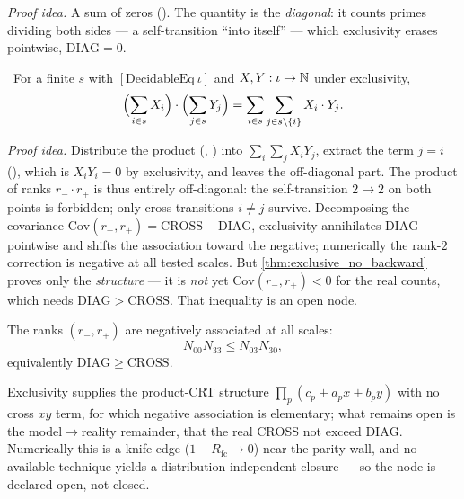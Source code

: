\emph{Proof idea.} A sum of zeros (). The quantity is the
\emph{diagonal}: it counts primes dividing both sides --- a self-transition ``into itself'' ---
which exclusivity erases pointwise, $\mathrm{DIAG}=0$.

\begin{theorem}\label{thm:exclusive_no_backward}
\green{}\ For a finite $s$ with $[\mathrm{DecidableEq}\ \iota]$ and $X,Y:\iota\to\mathbb{N}$ under exclusivity,
\begin{equation}\label{eq:no-backward}
\Bigl(\sum_{i\in s}X_i\Bigr)\cdot\Bigl(\sum_{j\in s}Y_j\Bigr)=\sum_{i\in s}\sum_{j\in s\setminus\{i\}}X_i\cdot Y_j.
\end{equation}
\end{theorem}

\emph{Proof idea.} Distribute the product (, ) into
$\sum_i\sum_j X_i Y_j$, extract the term $j=i$ (), which is $X_i Y_i=0$
by exclusivity, and  leaves the off-diagonal part. The product of ranks
$r_-\cdot r_+$ is thus entirely off-diagonal: the self-transition $2\to2$ on both points is
forbidden; only cross transitions $i\ne j$ survive. Decomposing the covariance
$\mathrm{Cov}(r_-,r_+)=\mathrm{CROSS}-\mathrm{DIAG}$, exclusivity annihilates $\mathrm{DIAG}$
pointwise and shifts the association toward the negative; numerically the rank-$2$ correction is
negative at all tested scales. But \cref{thm:exclusive_no_backward} proves only the \emph{structure}
--- it is \emph{not} yet $\mathrm{Cov}(r_-,r_+)<0$ for the real counts, which needs
$\mathrm{DIAG}>\mathrm{CROSS}$. That inequality is an open node.

\begin{conjecture}\label{cnj:neg-assoc}
\red{} The ranks $(r_-,r_+)$ are negatively associated at all scales:
\begin{equation}\label{eq:neg-assoc}
N_{00}N_{33}\le N_{03}N_{30},
\end{equation}
equivalently $\mathrm{DIAG}\ge\mathrm{CROSS}$.
\end{conjecture}

Exclusivity supplies the product-CRT structure $\prod_p(c_p+a_p x+b_p y)$ with no cross $xy$ term,
for which negative association is elementary; what remains open is the model$\to$reality remainder,
that the real $\mathrm{CROSS}$ not exceed $\mathrm{DIAG}$. Numerically this is a knife-edge
($1-R_{\mathrm{fc}}\to 0$) near the parity wall, and no available technique yields a
distribution-independent closure --- so the node is declared open, not closed.
